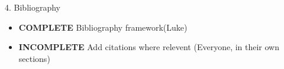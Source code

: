 4. Bibliography
\begin{itemize}
\item \textbf{COMPLETE} Bibliography framework(Luke)
\item \textbf{INCOMPLETE} Add citations where relevent (Everyone, in their own sections)
\end{itemize}
